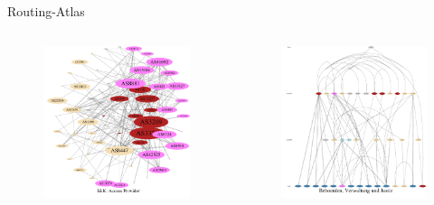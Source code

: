 \documentclass[ngerman,compress,hyperref={bookmarks}]{beamer}
\begin{document}
\begin{frame}[allowframebreaks]{Routing-Atlas}
  \begin{columns}[c]
    \begin{column}{0.5\textwidth}
      \begin{figure}
        \label{asgraphs}
        \includegraphics[width=1\textwidth]{images/asgraph_cat5-pos-betweenness}
      \end{figure}
    \end{column}
    \begin{column}{0.5\textwidth}
      \begin{figure}
        \includegraphics[width=1\textwidth]{images/asgraph_cat9-dot}

\end{figure}
\end{column}
\end{columns}
\end{frame}
\end{document}
